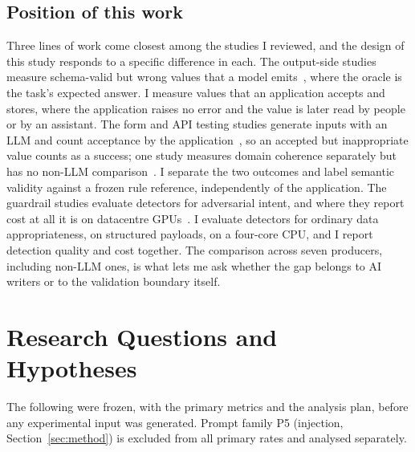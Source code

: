 \documentclass[conference]{IEEEtran}
\begin{document}
\subsection{Position of this work}
Three lines of work come closest among the studies I reviewed, and the design of this study responds
to a specific difference in each. The output-side studies measure schema-valid but wrong values that a
model emits~\cite{li2026orderbench,ray2026constrainttax,singh2026sob,wrenn2026enterprise}, where the
oracle is the task's expected answer. I measure values that an application accepts and stores, where
the application raises no error and the value is later read by people or by an assistant. The form and
API testing studies generate inputs with an LLM and count acceptance by the
application~\cite{alian2024formnexus,li2026webformtest}, so an accepted but inappropriate value counts
as a success; one study measures domain coherence separately but has no non-LLM
comparison~\cite{kim2025llamaresttest}. I separate the two outcomes and label semantic validity
against a frozen rule reference, independently of the application. The guardrail studies evaluate
detectors for adversarial intent, and where they report cost at all it is on datacentre
GPUs~\cite{ahmed2026reflexguard,saleem2026layered}. I evaluate detectors for ordinary data
appropriateness, on structured payloads, on a four-core CPU, and I report detection quality and cost
together. The comparison across seven producers, including non-LLM ones, is what lets me ask whether
the gap belongs to AI writers or to the validation boundary itself.

\section{Research Questions and Hypotheses}
\label{sec:rq}

The following were frozen, with the primary metrics and the analysis plan, before any experimental
input was generated. Prompt family P5 (injection, Section~\ref{sec:method}) is excluded from all
primary rates and analysed separately.
\end{document}
